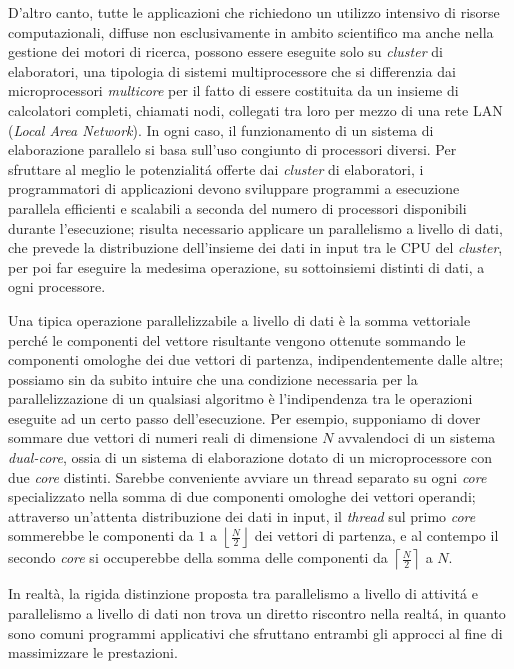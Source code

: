 D'altro canto, tutte le applicazioni che richiedono un utilizzo intensivo di risorse computazionali, diffuse non esclusivamente in ambito
scientifico ma anche nella gestione  dei motori di ricerca, possono essere eseguite solo su \textit{cluster} di elaboratori, una tipologia di sistemi multiprocessore che si differenzia dai microprocessori \textit{multicore} per il fatto di essere costituita da un insieme di calcolatori completi, chiamati nodi, collegati tra loro per mezzo di una rete LAN (\textit{Local Area Network}).\newline
In ogni caso, il funzionamento di un sistema di elaborazione parallelo si basa sull'uso congiunto di processori diversi.\newline
Per sfruttare al meglio le potenzialit\'a offerte dai \textit{cluster} di elaboratori, i programmatori di applicazioni devono sviluppare programmi a esecuzione parallela efficienti e scalabili a seconda del numero di processori disponibili durante l'esecuzione; risulta necessario applicare un parallelismo a livello di dati, che prevede la distribuzione dell'insieme dei dati in input tra le CPU del \textit{cluster}, per poi far eseguire la medesima operazione, su sottoinsiemi distinti di dati, a ogni processore.

Una tipica operazione parallelizzabile a livello di dati è la somma vettoriale perch\'e le componenti del vettore risultante vengono ottenute
sommando le componenti omologhe dei due vettori di partenza, indipendentemente dalle altre; possiamo sin da subito intuire che una condizione necessaria per la parallelizzazione di un qualsiasi algoritmo è l'indipendenza tra le operazioni eseguite ad un certo passo dell'esecuzione.\newline
Per esempio, supponiamo di dover sommare due vettori di numeri reali di dimensione $N$ avvalendoci di un sistema \textit{dual-core}, ossia di un sistema di elaborazione dotato di un microprocessore con
due \textit{core} distinti.\newline
Sarebbe conveniente avviare un thread separato su ogni \textit{core} specializzato nella somma di due componenti omologhe dei vettori operandi; attraverso un'attenta distribuzione dei dati in input, il \textit{thread} sul primo \textit{core} sommerebbe le componenti da $1$ a $\left\lfloor\frac{N}{2}\right\rfloor$ dei vettori di partenza,
e al contempo il secondo \textit{core} si occuperebbe della somma delle componenti da $\left\lceil\frac{N}{2}\right\rceil$ a $N$.

In realtà, la rigida distinzione proposta tra parallelismo a livello di attivit\'a e parallelismo a livello di dati non trova un diretto
riscontro nella realt\'a, in quanto sono comuni programmi applicativi che sfruttano entrambi gli approcci al fine di massimizzare le prestazioni.

